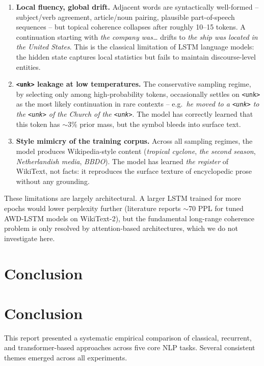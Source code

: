 \documentclass[11pt,a4paper]{article}
\begin{document}
\begin{enumerate}[noitemsep]
    \item \textbf{Local fluency, global drift.} Adjacent words are
    syntactically well-formed -- subject/verb agreement, article/noun
    pairing, plausible part-of-speech sequences -- but topical
    coherence collapses after roughly 10--15 tokens. A continuation
    starting with \emph{the company was\ldots} drifts to
    \emph{the ship was located in the United States}.
    This is the classical limitation of LSTM language models: the
    hidden state captures local statistics but fails to maintain
    discourse-level entities.
    \item \textbf{\texttt{<unk>} leakage at low temperatures.}
    The conservative sampling regime, by selecting only among
    high-probability tokens, occasionally settles on \texttt{<unk>} as
    the most likely continuation in rare contexts -- e.g.\
    \emph{he moved to a {\normalfont\texttt{<unk>}} to the {\normalfont\texttt{<unk>}}
    of the Church of the {\normalfont\texttt{<unk>}}}.
    The model has correctly learned that this token has $\sim$3\% prior
    mass, but the symbol bleeds into surface text.
    \item \textbf{Style mimicry of the training corpus.}
    Across all sampling regimes, the model produces Wikipedia-style
    content (\emph{tropical cyclone}, \emph{the second season},
    \emph{Netherlandish media}, \emph{BBDO}). The model has learned
    \emph{the register} of WikiText, not facts: it reproduces the
    surface texture of encyclopedic prose without any grounding.
\end{enumerate}

These limitations are largely architectural. A larger LSTM trained
for more epochs would lower perplexity further (literature reports
$\sim$70 PPL for tuned AWD-LSTM models on WikiText-2), but the
fundamental long-range coherence problem is only resolved by
attention-based architectures, which we do not investigate here.

\section{Conclusion}
\section{Conclusion}

This report presented a systematic empirical comparison of classical, recurrent,
and transformer-based approaches across five core NLP tasks. Several consistent
themes emerged across all experiments.
\end{document}
